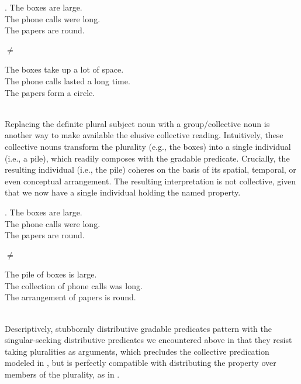 \documentclass[linguex]{sp}
\begin{document}
\begin{minipage}{.405\textwidth}
	\ex.
	The boxes are large.\\
	The phone calls were long.\\
	The papers are round.
	
\end{minipage}
\begin{minipage}{.05\textwidth}
	$\neq$
\end{minipage}
\begin{minipage}{.5\textwidth}
	The boxes take up a lot of space.\\
	The phone calls lasted a long time.\\
	The papers form a circle.
\end{minipage}\\[5pt]

Replacing the definite plural subject noun with a group/collective noun \citep[i.e., an atomizer;][]{scontras2014diss} is another way to make available the elusive collective reading. Intuitively, these collective nouns transform the plurality (e.g., the boxes) into a single individual (i.e., a pile), which readily composes with the gradable predicate. Crucially, the resulting individual (i.e., the pile) coheres on the basis of its spatial, temporal, or even conceptual arrangement. The resulting interpretation is not collective, given that we now have a single individual holding the named property.\\

\begin{minipage}{.405\textwidth}
	\ex.
	The boxes are large.\\
	The phone calls were long.\\
	The papers are round.
	
\end{minipage}
\begin{minipage}{.05\textwidth}
	$\neq$
\end{minipage}
\begin{minipage}{.5\textwidth}
	The pile of boxes is large.\\
	The collection of phone calls was long.\\
	The arrangement of papers is round.
\end{minipage}\\[5pt]

Descriptively, stubbornly distributive gradable predicates pattern with the singular-seeking distributive predicates we encountered above in that they resist taking pluralities as arguments, which precludes the collective predication modeled in \Next[a], but is perfectly compatible with distributing the property over members of the plurality, as in \Next[b].
\end{document}
